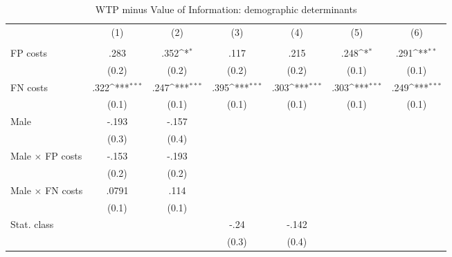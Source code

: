 \begin{table}[htbp]\centering
\def\sym#1{\ifmmode^{#1}\else\(^{#1}\)\fi}
\caption{WTP minus Value of Information: demographic determinants}
\begin{tabular}{l*{6}{c}}
\hline\hline
                &\multicolumn{1}{c}{(1)}&\multicolumn{1}{c}{(2)}&\multicolumn{1}{c}{(3)}&\multicolumn{1}{c}{(4)}&\multicolumn{1}{c}{(5)}&\multicolumn{1}{c}{(6)}\\
                &\multicolumn{1}{c}{}&\multicolumn{1}{c}{}&\multicolumn{1}{c}{}&\multicolumn{1}{c}{}&\multicolumn{1}{c}{}&\multicolumn{1}{c}{}\\
\hline
FP costs        &     .283         &     .352\sym{*}  &     .117         &     .215         &     .248\sym{*}  &     .291\sym{**} \\
                &    (0.2)         &    (0.2)         &    (0.2)         &    (0.2)         &    (0.1)         &    (0.1)         \\
FN costs        &     .322\sym{***}&     .247\sym{***}&     .395\sym{***}&     .303\sym{***}&     .303\sym{***}&     .249\sym{***}\\
                &    (0.1)         &    (0.1)         &    (0.1)         &    (0.1)         &    (0.1)         &    (0.1)         \\
Male            &    -.193         &    -.157         &                  &                  &                  &                  \\
                &    (0.3)         &    (0.4)         &                  &                  &                  &                  \\
Male $\times$ FP costs&    -.153         &    -.193         &                  &                  &                  &                  \\
                &    (0.2)         &    (0.2)         &                  &                  &                  &                  \\
Male $\times$ FN costs&    .0791         &     .114         &                  &                  &                  &                  \\
                &    (0.1)         &    (0.1)         &                  &                  &                  &                  \\
Stat. class     &                  &                  &     -.24         &    -.142         &                  &                  \\
                &                  &                  &    (0.3)         &    (0.4)         &                  &                  \\

\end{tabular}
\end{table}
